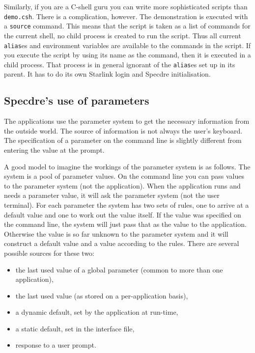 Similarly, if you are a C-shell guru you can write more sophisticated scripts
than {\tt demo.csh}. There is a complication, however. The demonstration is
executed with a {\tt source} command. This means that the script is taken as a
list of commands for the current shell, no child process is created to run the
script. Thus all current {\tt alias}es and environment variables are available
to the commands in the script. If you execute the script by using its name as
the command, then it is executed in a child process. That process is in general
ignorant of the {\tt alias}es set up in its parent. It has to do its own
Starlink login and Specdre initialisation.

\goodbreak
\subsection{Specdre's use of parameters}

The applications use the parameter system to get the necessary information
from the outside world. The source of information is not always the user's
keyboard. The specification of a parameter on the command line is slightly
different from entering the value at the prompt.

A good model to imagine the workings of the parameter system is as
follows.  The system is a pool of parameter values. On the command line
you can pass values to the parameter system (not the application). When
the application runs and needs a parameter value, it will ask the
parameter system (not the user terminal). For each parameter the system
has two sets of rules, one to arrive at a default value and one to work
out the value itself. If the value was specified on the command line,
the system will just pass that as the value to the application.
Otherwise the value is so far unknown to the parameter system and it
will construct a default value and a value according to the rules.
There are several possible sources for these two:

\begin{itemize}
\item the last used value of a global parameter (common to more than one
application),

\item the last used value (as stored on a per-application basis),

\item a dynamic default, set by the application at run-time,

\item a static default, set in the interface file,

\item response to a user prompt.
\end{itemize}

